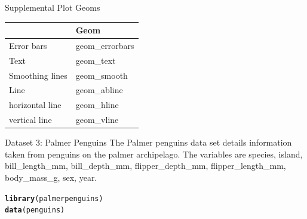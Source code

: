 \documentclass{beamer}\usepackage[]{graphicx}\usepackage[]{xcolor}
\makeatletter
\newcommand{\hlstd}[1]{\textcolor[rgb]{0.345,0.345,0.345}{#1}}%
\newcommand{\hlkwd}[1]{\textcolor[rgb]{0.737,0.353,0.396}{\textbf{#1}}}%
\newenvironment{kframe}{%
 \def\at@end@of@kframe{}%
 \ifinner\ifhmode%
  \def\at@end@of@kframe{\end{minipage}}%
  \begin{minipage}{\columnwidth}%
 \fi\fi%
 \def\FrameCommand##1{\hskip\@totalleftmargin \hskip-\fboxsep
 \colorbox{shadecolor}{##1}\hskip-\fboxsep
     \hskip-\linewidth \hskip-\@totalleftmargin \hskip\columnwidth}%
 \MakeFramed {\advance\hsize-\width
   \@totalleftmargin\z@ \linewidth\hsize
   \@setminipage}}%
 {\par\unskip\endMakeFramed%
 \at@end@of@kframe}
\newenvironment{knitrout}{}{} %
\makeatother
\begin{document}
\begin{frame}[fragile]{Supplemental Plot Geoms}
\begin{table}[]
\begin{tabular}{|l|l|}
\hline
                & Geom            \\ \hline
Error bars      & geom\_errorbars \\ \hline
Text            & geom\_text      \\ \hline
Smoothing lines & geom\_smooth    \\ \hline
Line            & geom\_abline    \\ \hline
horizontal line & geom\_hline     \\ \hline
vertical line   & geom\_vline     \\ \hline
\end{tabular}
\end{table}
\end{frame}


\begin{frame}[fragile]{Dataset 3:  Palmer Penguins}
The Palmer penguins data set details information taken from penguins on the palmer archipelago.  The variables are
species, island, bill\_length\_mm, bill\_depth\_mm, flipper\_depth\_mm, flipper\_length\_mm, body\_mass\_g, sex, year.
\begin{knitrout}
\color{fgcolor}\begin{kframe}
\begin{alltt}
\hlkwd{library}\hlstd{(palmerpenguins)}
\hlkwd{data}\hlstd{(penguins)}
\end{alltt}
\end{kframe}
\end{knitrout}
\end{frame}
\end{document}
